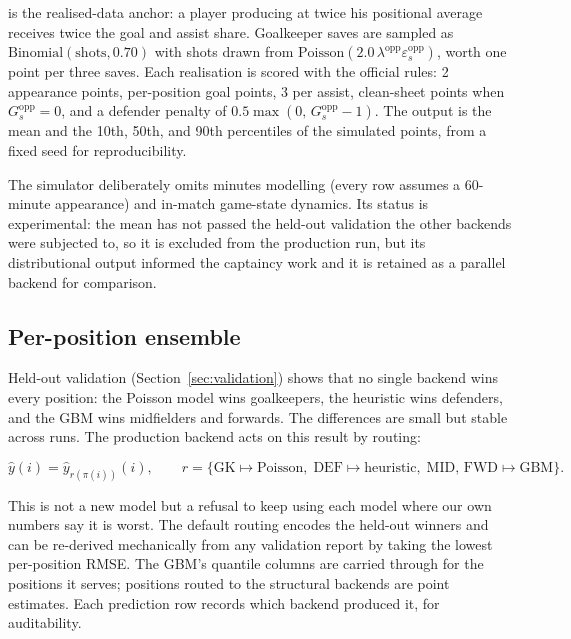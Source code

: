 is the realised-data anchor: a player producing at twice his
positional average receives twice the goal and assist share.
Goalkeeper saves are sampled as $\mathrm{Binomial}(\text{shots},
0.70)$ with shots drawn from $\mathrm{Poisson}(2.0\,
\lambda^{\mathrm{opp}} \varepsilon^{\mathrm{opp}}_s)$, worth one
point per three saves. Each realisation is scored with the official
rules: 2 appearance points, per-position goal points, 3 per assist,
clean-sheet points when $G^{\mathrm{opp}}_s = 0$, and a defender
penalty of $0.5 \max(0,\, G^{\mathrm{opp}}_s - 1)$. The output is
the mean and the 10th, 50th, and 90th percentiles of the simulated
points, from a fixed seed for reproducibility.

The simulator deliberately omits minutes modelling (every row assumes
a 60-minute appearance) and in-match game-state dynamics. Its status
is experimental: the mean has not passed the held-out validation the
other backends were subjected to, so it is excluded from the
production run, but its distributional output informed the captaincy
work and it is retained as a parallel backend for comparison.

\subsection{Per-position ensemble}
\label{sec:methodology-ensemble}

Held-out validation (Section~\ref{sec:validation}) shows that no
single backend wins every position: the Poisson model wins
goalkeepers, the heuristic wins defenders, and the GBM wins
midfielders and forwards. The differences are small but stable
across runs. The production backend acts on this result by routing:

\begin{equation}
\hat{y}(i) = \hat{y}_{r(\pi(i))}(i),
\qquad
r = \bigl\{\mathrm{GK} \mapsto \text{Poisson},\;
  \mathrm{DEF} \mapsto \text{heuristic},\;
  \mathrm{MID},\, \mathrm{FWD} \mapsto \text{GBM}\bigr\}.
\label{eq:ensemble}
\end{equation}

This is not a new model but a refusal to keep using each model where
our own numbers say it is worst. The default routing encodes the
held-out winners and can be re-derived mechanically from any
validation report by taking the lowest per-position RMSE. The GBM's
quantile columns are carried through for the positions it serves;
positions routed to the structural backends are point estimates. Each
prediction row records which backend produced it, for auditability.

